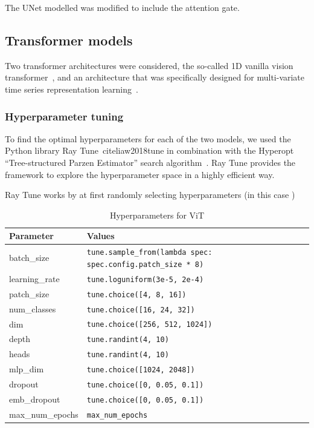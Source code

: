 The UNet modelled was modified to include the attention gate.

\subsection{Transformer models}

Two transformer architectures were considered, the so-called 1D vanilla vision transformer~\cite{Dosovitskiy_2021_ViT,}, and an architecture that was specifically designed for multi-variate time series representation learning~\cite{Zerveas_2020_mvts}.

\subsubsection{Hyperparameter tuning}

To find the optimal hyperparameters for each of the two models, we used the Python library Ray Tune~cite{liaw2018tune} in combination with the Hyperopt \enquote{Tree-structured Parzen Estimator} search algorithm~\cite{Bergstra_Bardenet_Bengio_Kégl_2011}. Ray Tune provides the framework to explore the hyperparameter space in a highly efficient way. 

Ray Tune works by at first randomly selecting hyperparameters (in this case )

\begin{table}[h]
    \centering
    \caption{Hyperparameters for ViT}
    \label{tab:config_parameters}
    \begin{tabular}{@{}ll@{}}
    \toprule
    Parameter       & Values \\ 
    \midrule
    batch\_size     & \texttt{tune.sample\_from(lambda spec: spec.config.patch\_size * 8)} \\
    learning\_rate  & \texttt{tune.loguniform(3e-5, 2e-4)} \\
    patch\_size     & \texttt{tune.choice([4, 8, 16])} \\
    num\_classes    & \texttt{tune.choice([16, 24, 32])} \\
    dim             & \texttt{tune.choice([256, 512, 1024])} \\
    depth           & \texttt{tune.randint(4, 10)} \\
    heads           & \texttt{tune.randint(4, 10)} \\
    mlp\_dim        & \texttt{tune.choice([1024, 2048])} \\
    dropout         & \texttt{tune.choice([0, 0.05, 0.1])} \\
    emb\_dropout    & \texttt{tune.choice([0, 0.05, 0.1])} \\
    max\_num\_epochs & \texttt{max\_num\_epochs}        \\ \bottomrule
    \end{tabular}
\end{table}


